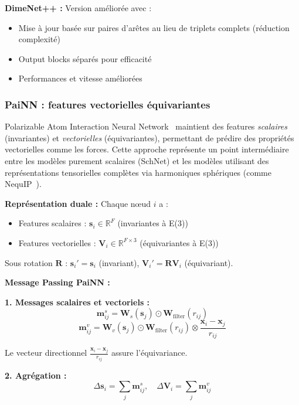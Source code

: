\textbf{DimeNet++ :}
Version améliorée avec :
\begin{itemize}
    \item Mise à jour basée sur paires d'arêtes au lieu de triplets complets (réduction complexité)
    \item Output blocks séparés pour efficacité
    \item Performances et vitesse améliorées
\end{itemize}

\subsubsection{PaiNN : features vectorielles équivariantes}

Polarizable Atom Interaction Neural Network~\cite{Schutt2021} maintient des features \textit{scalaires} (invariantes) et \textit{vectorielles} (équivariantes), permettant de prédire des propriétés vectorielles comme les forces. Cette approche représente un point intermédiaire entre les modèles purement scalaires (SchNet) et les modèles utilisant des représentations tensorielles complètes via harmoniques sphériques (comme NequIP~\cite{Batzner2022}).

\textbf{Représentation duale :}
Chaque nœud $i$ a :
\begin{itemize}
    \item Features scalaires : $\mathbf{s}_i \in \mathbb{R}^{F}$ (invariantes à E(3))
    \item Features vectorielles : $\mathbf{V}_i \in \mathbb{R}^{F \times 3}$ (équivariantes à E(3))
\end{itemize}

Sous rotation $\mathbf{R}$ : $\mathbf{s}_i' = \mathbf{s}_i$ (invariant), $\mathbf{V}_i' = \mathbf{R} \mathbf{V}_i$ (équivariant).

\textbf{Message Passing PaiNN :}

\textbf{1. Messages scalaires et vectoriels :}
\[
\mathbf{m}_{ij}^s = \mathbf{W}_s(\mathbf{s}_j) \odot \mathbf{W}_{\text{filter}}(r_{ij})
\]
\[
\mathbf{m}_{ij}^v = \mathbf{W}_v(\mathbf{s}_j) \odot \mathbf{W}_{\text{filter}}(r_{ij}) \otimes \frac{\mathbf{x}_i - \mathbf{x}_j}{r_{ij}}
\]

Le vecteur directionnel $\frac{\mathbf{x}_i - \mathbf{x}_j}{r_{ij}}$ assure l'équivariance.

\textbf{2. Agrégation :}
\[
\Delta \mathbf{s}_i = \sum_{j} \mathbf{m}_{ij}^s, \quad \Delta \mathbf{V}_i = \sum_{j} \mathbf{m}_{ij}^v
\]


